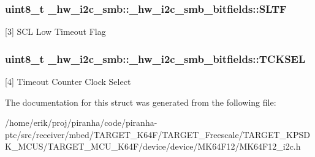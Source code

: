 \subsubsection[{\texorpdfstring{S\+L\+TF}{SLTF}}]{\setlength{\rightskip}{0pt plus 5cm}uint8\+\_\+t \+\_\+hw\+\_\+i2c\+\_\+smb\+::\+\_\+hw\+\_\+i2c\+\_\+smb\+\_\+bitfields\+::\+S\+L\+TF}\hypertarget{struct__hw__i2c__smb_1_1__hw__i2c__smb__bitfields_a42607d426272eea995b551d134f3898b}{}\label{struct__hw__i2c__smb_1_1__hw__i2c__smb__bitfields_a42607d426272eea995b551d134f3898b}
\mbox{[}3\mbox{]} S\+CL Low Timeout Flag 
\subsubsection[{\texorpdfstring{T\+C\+K\+S\+EL}{TCKSEL}}]{\setlength{\rightskip}{0pt plus 5cm}uint8\+\_\+t \+\_\+hw\+\_\+i2c\+\_\+smb\+::\+\_\+hw\+\_\+i2c\+\_\+smb\+\_\+bitfields\+::\+T\+C\+K\+S\+EL}\hypertarget{struct__hw__i2c__smb_1_1__hw__i2c__smb__bitfields_a8d6f6dab58b178196790e44adcc9064e}{}\label{struct__hw__i2c__smb_1_1__hw__i2c__smb__bitfields_a8d6f6dab58b178196790e44adcc9064e}
\mbox{[}4\mbox{]} Timeout Counter Clock Select 

The documentation for this struct was generated from the following file\+:\begin{DoxyCompactItemize}
\item 
/home/erik/proj/piranha/code/piranha-\/ptc/src/receiver/mbed/\+T\+A\+R\+G\+E\+T\+\_\+\+K64\+F/\+T\+A\+R\+G\+E\+T\+\_\+\+Freescale/\+T\+A\+R\+G\+E\+T\+\_\+\+K\+P\+S\+D\+K\+\_\+\+M\+C\+U\+S/\+T\+A\+R\+G\+E\+T\+\_\+\+M\+C\+U\+\_\+\+K64\+F/device/device/\+M\+K64\+F12/M\+K64\+F12\+\_\+i2c.\+h\end{DoxyCompactItemize}
